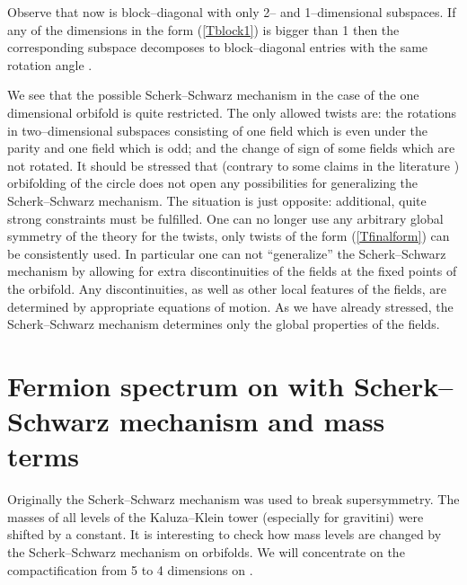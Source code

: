 \documentclass[a4paper,12pt]{article}
\def\ZZ{\mathbb Z}
\begin{document}
Observe that now \coordHE{} is block--diagonal with only 2-- and
1--dimensional subspaces. If any of the dimensions \coordHE{} in the form
(\ref{Tblock1}) is bigger than 1 then the corresponding
\coordHE{} subspace decomposes to \coordHE{} 
block--diagonal entries with the same rotation angle \myHighlight{$2\pi\alpha$}\coordHE{}.

We see that the possible Scherk--Schwarz mechanism in the
case of the one dimensional orbifold \myHighlight{$S^1/\ZZ_2$}\coordHE{} is quite restricted. 
The only allowed twists are: the rotations in two--dimensional
subspaces consisting of one field which is even under the \myHighlight{$\ZZ_2$}\coordHE{}
parity and one field which is odd; and the change of sign of some
fields which are not rotated. It should be stressed that
(contrary to some claims in the literature \cite{Bagger:2001qi})
orbifolding of the circle does not open any possibilities for
generalizing the Scherk--Schwarz mechanism. The situation is just
opposite: additional, quite strong constraints must be fulfilled. One
can no longer use any arbitrary global symmetry of the theory for the
twists, only  twists of the form (\ref{Tfinalform}) can be
consistently used. 
In particular one can not ``generalize'' the Scherk--Schwarz mechanism
by allowing for extra discontinuities of the fields at the fixed
points of the orbifold. Any discontinuities, as well as other local
features of the fields, are determined by appropriate equations of
motion. As we have already stressed, the Scherk--Schwarz mechanism
determines only the global properties of the fields.



\section{Fermion spectrum on \myHighlight{$\boldsymbol{S^1/\ZZ_2}$}\coordHE{} with
Scherk--Schwarz mechanism and mass terms} 


Originally the Scherk--Schwarz mechanism
\cite{Scherk:1978ta,Scherk:1979zr} was used to break
supersymmetry. The masses of all levels of the Kaluza--Klein tower 
(especially for gravitini) were
shifted by a constant. It is interesting to check how mass levels are 
changed by the Scherk--Schwarz mechanism on orbifolds. We will
concentrate on the compactification from 5 to 4 dimensions on
\myHighlight{$S^1/\ZZ_2$}\coordHE{}. 
\end{document}
